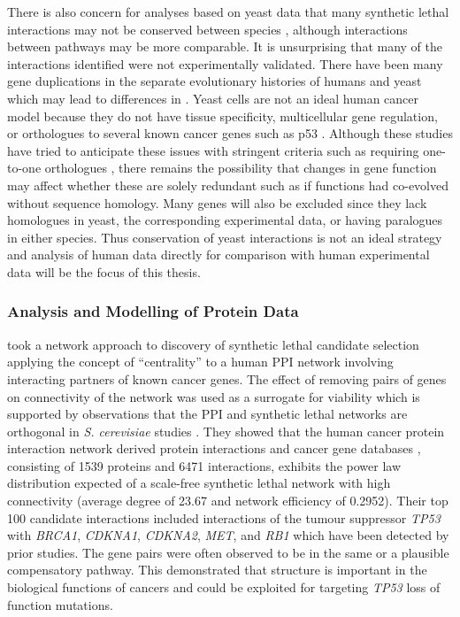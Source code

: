 There is also concern for analyses based on yeast data that many \gls{synthetic lethal} interactions may not be conserved between species \citep{Dixon2009a}, although interactions between \glspl{pathway} may be more comparable. It is unsurprising that many of the interactions identified were not experimentally validated. There have been many gene duplications in the separate evolutionary histories of humans and yeast which may lead to differences in . Yeast cells are not an ideal human cancer model because they do not have tissue specificity, multicellular gene regulation, or orthologues to several known \glspl{cancer gene} such as p53 \citep{Guaragnella2014}. Although these studies have tried to anticipate these issues with stringent criteria such as requiring one-to-one orthologues \citep{Deshpande2013, Heiskanen2012, Kranthi2013}, there remains the possibility that changes in gene function may affect whether these are solely redundant such as if functions had co-evolved without sequence homology. Many genes will also be excluded since they lack homologues in yeast, the corresponding experimental data, or having paralogues in either species. Thus conservation of yeast interactions is not an ideal strategy and analysis of human data directly for comparison with human experimental data will be the focus of this thesis. 

\subsubsection{Analysis and Modelling of Protein Data}

\citet{Kranthi2013} took a network approach to discovery of \gls{synthetic lethal} candidate selection applying the concept of ``centrality'' to a human \gls{PPI} network involving interacting partners of known \glspl{cancer gene}. The effect of removing pairs of genes on connectivity of the network was used as a surrogate for viability which is supported by observations that the \gls{PPI} and \gls{synthetic lethal} networks are orthogonal in \textit{S. cerevisiae} studies \citep{Tong2004}. They showed that the human cancer protein interaction network derived protein interactions and cancer gene databases \citep{Futreal2004, Higgins2007,KeshavaPrasad2009}, consisting of 1539 proteins and 6471 interactions, exhibits the power law distribution expected of a \gls{scale-free} \gls{synthetic lethal} network with high connectivity (average  degree of 23.67 and network efficiency of 0.2952). Their top 100 candidate interactions included interactions of the \gls{tumour suppressor} \textit{TP53} with \textit{BRCA1}, \textit{CDKNA1}, \textit{CDKNA2}, \textit{MET}, and \textit{RB1} which have been detected by prior studies. The gene pairs were often observed to be in the same or a plausible compensatory pathway. This demonstrated that  structure is important in the biological functions of cancers and could be exploited for targeting \textit{TP53} loss of function \glspl{mutation}. 


